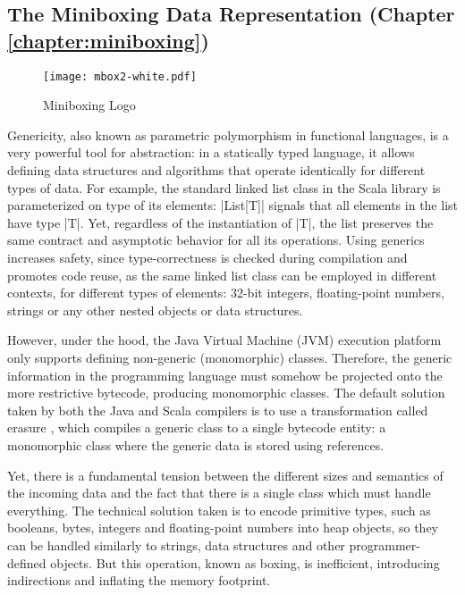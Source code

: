 \subsection{The Miniboxing Data Representation (Chapter \ref{chapter:miniboxing})}

\begin{wrapfigure}{r}{50mm}
  \centering
  \vspace{-3em}
  \texttt{[image: mbox2-white.pdf]}
  \vspace{-3em}
  \caption{Miniboxing Logo}
\end{wrapfigure}

Genericity, also known as parametric polymorphism in functional languages, is a very powerful tool for abstraction: in a statically typed language, it allows defining data structures and algorithms that operate identically for different types of data. For example, the standard linked list class in the Scala library is parameterized on type of its elements: |List[T]| signals that all elements in the list have type |T|. Yet, regardless of the instantiation of |T|, the list preserves the same contract and asymptotic behavior for all its operations. Using generics increases safety, since type-correctness is checked during compilation and promotes code reuse, as the same linked list class can be employed in different contexts, for different types of elements: 32-bit integers, floating-point numbers, strings or any other nested objects or data structures.

However, under the hood, the Java Virtual Machine (JVM) execution platform only supports defining non-generic (monomorphic) classes. Therefore, the generic information in the programming language must somehow be projected onto the more restrictive bytecode, producing monomorphic classes. The default solution taken by both the Java and Scala compilers is to use a transformation called erasure \cite{java-erasure}, which compiles a generic class to a single bytecode entity: a monomorphic class where the generic data is stored using references.

Yet, there is a fundamental tension between the different sizes and semantics of the incoming data and the fact that there is a single class which must handle everything. The technical solution taken is to encode primitive types, such as booleans, bytes, integers and floating-point numbers into heap objects, so they can be handled similarly to strings, data structures and other programmer-defined objects. But this operation, known as boxing, is inefficient, introducing indirections and inflating the memory footprint.

